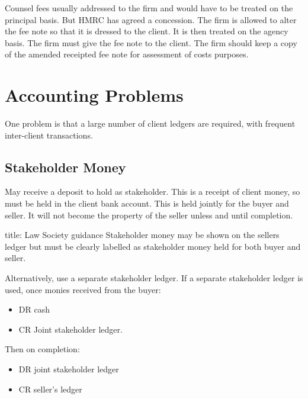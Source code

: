 \documentclass[
]{article}
\newenvironment{Shaded}{}{}
\newcommand{\NormalTok}[1]{#1}
\providecommand{\tightlist}{%
  \setlength{\itemsep}{0pt}\setlength{\parskip}{0pt}}
\begin{document}
Counsel fees usually addressed to the firm and would have to be treated
on the principal basis. But HMRC has agreed a concession. The firm is
allowed to alter the fee note so that it is dressed to the client. It is
then treated on the agency basis. The firm must give the fee note to the
client. The firm should keep a copy of the amended receipted fee note
for assessment of costs purposes.

\hypertarget{accounting-problems}{%
\section{Accounting Problems}\label{accounting-problems}}

One problem is that a large number of client ledgers are required, with
frequent inter-client transactions.

\hypertarget{stakeholder-money}{%
\subsection{Stakeholder Money}\label{stakeholder-money}}

May receive a deposit to hold as stakeholder. This is a receipt of
client money, so must be held in the client bank account. This is held
jointly for the buyer and seller. It will not become the property of the
seller unless and until completion.

\begin{Shaded}
\begin{Highlighting}[]
\NormalTok{title: Law Society guidance}
\NormalTok{Stakeholder money may be shown on the seller\textquotesingle{}s ledger but must be clearly labelled as stakeholder money held for both buyer and seller. }
\end{Highlighting}
\end{Shaded}

Alternatively, use a separate stakeholder ledger. If a separate
stakeholder ledger is used, once monies received from the buyer:

\begin{itemize}
\tightlist
\item
  DR cash
\item
  CR Joint stakeholder ledger.
\end{itemize}

Then on completion:

\begin{itemize}
\tightlist
\item
  DR joint stakeholder ledger
\item
  CR seller's ledger
\end{itemize}
\end{document}

